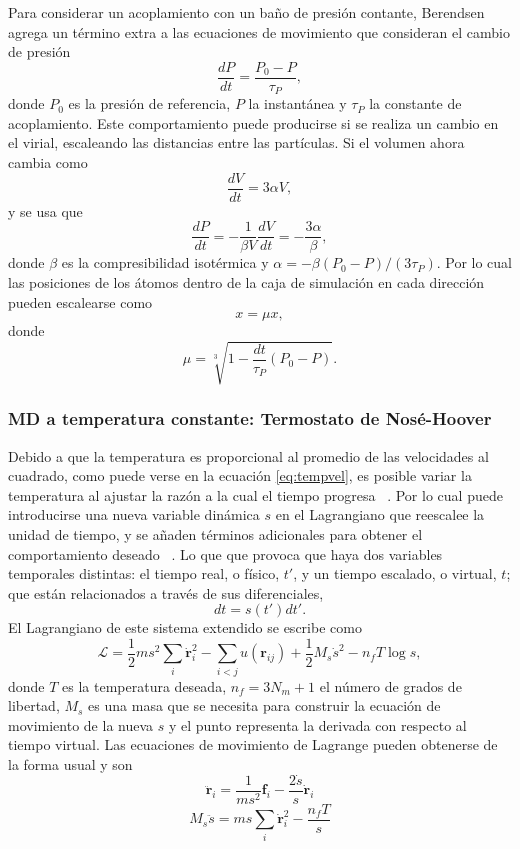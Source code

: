 Para considerar un acoplamiento con un baño de presión contante, Berendsen 
\cite{berendsen1984} agrega un término extra a las ecuaciones de movimiento que
consideran el cambio de presión
$$
\frac{dP}{dt} = \frac{P_0 - P}{\tau_P},
$$
donde $P_0$ es la presión de referencia, $P$ la instantánea y $\tau_P$ la 
constante de acoplamiento. Este comportamiento puede producirse si se realiza un
cambio en el virial, escaleando las distancias entre las partículas. Si el 
volumen ahora cambia como 
$$
\frac{dV}{dt} = 3 \alpha V,
$$
y se usa que
$$
\frac{dP}{dt} = - \frac{1}{\beta V} \frac{dV}{dt} = -\frac{3\alpha}{\beta},
$$
donde $\beta$ es la compresibilidad isotérmica y $\alpha = - \beta (P_0 - P) / (3 \tau_P)$.
Por lo cual las posiciones de los átomos dentro de la caja de simulación en cada
dirección pueden escalearse como
$$
x = \mu x,
$$
donde
$$
\mu = \sqrt[3]{1 - \frac{dt}{\tau_P} (P_0 - P)}.
$$

\subsubsection{MD a temperatura constante: Termostato de Nosé-Hoover}

Debido a que la temperatura es proporcional al promedio de las velocidades al 
cuadrado, como puede verse en la ecuación \ref{eq:tempvel}, es posible variar
la temperatura al ajustar la razón a la cual el tiempo progresa 
~\cite{nose1984a}. Por lo cual puede introducirse una nueva variable dinámica
$s$ en el Lagrangiano que reescalee la unidad de tiempo, y se añaden términos 
adicionales para obtener el comportamiento deseado ~\cite{rapaport2004}. Lo que 
que provoca que haya dos variables temporales distintas: el tiempo real, o físico, 
$t'$, y un tiempo escalado, o virtual, $t$; que están relacionados a través de 
sus diferenciales,
$$
dt = s(t') dt'.
$$
El Lagrangiano de este sistema extendido se escribe como
$$
\mathcal{L} = \frac{1}{2} m s^2 \sum_i \dot{\mathbf{r}}_i^2 - \sum_{i<j} u(\mathbf{r}_{ij}) + \frac{1}{2} M_s \dot{s}^2 - n_f T \log s,
$$
donde $T$ es la temperatura deseada, $n_f = 3N_m + 1$ el número de grados de 
libertad, $M_s$ es una masa que se necesita para construir la ecuación de 
movimiento de la nueva  $s$ y el punto representa la derivada
con respecto al tiempo virtual. Las ecuaciones de movimiento de Lagrange pueden 
obtenerse de la forma usual y son
$$
\ddot{\mathbf{r}}_i = \frac{1}{m s^2} \mathbf{f}_i - \frac{2 \dot{s}}{s} \dot{\mathbf{r}}_i
$$
$$
M_s \ddot{s} = m s \sum_i \dot{\mathbf{r}}_i^2 - \frac{n_f T}{s}
$$

